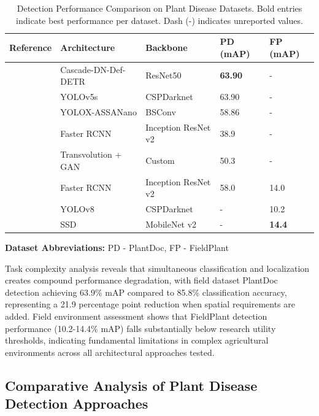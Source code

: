 \documentclass[sn-mathphys]{sn-jnl}
\theoremstyle{thmstyleone}%
\theoremstyle{thmstyletwo}%
\theoremstyle{thmstylethree}%
\begin{document}
\begin{table}[h!]
  \small
  \centering
  \caption{Detection Performance Comparison on Plant Disease Datasets. Bold entries indicate best performance per dataset. Dash (-) indicates unreported values.}
  \label{tab:detection_performance}
  \begin{tabular}{@{}p{2.5cm}p{2cm}p{3.5cm}p{1.25cm}p{1.25cm}@{}}
    \toprule
    \textbf{Reference} & \textbf{Architecture} & \textbf{Backbone} & \textbf{PD (mAP)} & \textbf{FP (mAP)} \\
    \midrule
    \citet{ye2023cascade} & Cascade-DN-Def-DETR & ResNet50 & \textbf{63.90} & - \\
    \citet{li2022improved} & YOLOv5s & CSPDarknet & 63.90 & - \\
    \citet{liu2022improved} & YOLOX-ASSANano & BSConv & 58.86 & - \\
    \citet{singh2019plant} & Faster RCNN & Inception ResNet v2 & 38.9 & - \\
    \citet{zhang2022automatic} & Transvolution + GAN & Custom & 50.3 & - \\
    \citet{moupojou2023fieldplant} & Faster RCNN & Inception ResNet v2 & 58.0 & 14.0 \\
    \citet{moupojou2023fieldplant} & YOLOv8 & CSPDarknet & - & 10.2 \\
    \citet{moupojou2023fieldplant} & SSD & MobileNet v2 & - & \textbf{14.4} \\
    \bottomrule
  \end{tabular}
  
  \vspace{0.2cm}
  \footnotesize
  \textbf{Dataset Abbreviations:} PD - PlantDoc, FP - FieldPlant
\end{table}


Task complexity analysis reveals that simultaneous classification and localization creates compound performance degradation, with field dataset PlantDoc detection achieving 63.9\% mAP compared to 85.8\% classification accuracy, representing a 21.9 percentage point reduction when spatial requirements are added. Field environment assessment shows that FieldPlant detection performance (10.2-14.4\% mAP) falls substantially below research utility thresholds, indicating fundamental limitations in complex agricultural environments across all architectural approaches tested.

\subsection{Comparative Analysis of Plant Disease Detection Approaches}
\end{document}
